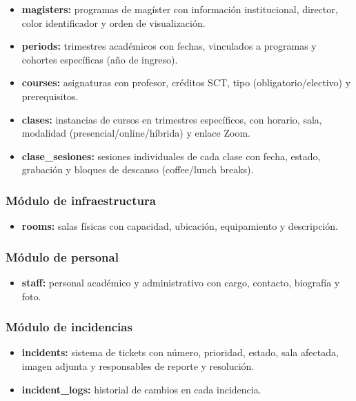 \begin{itemize}
    \item \textbf{magisters:} programas de magíster con información institucional, director, color identificador y orden de visualización.
    \item \textbf{periods:} trimestres académicos con fechas, vinculados a programas y cohortes específicas (año de ingreso).
    \item \textbf{courses:} asignaturas con profesor, créditos SCT, tipo (obligatorio/electivo) y prerequisitos.
    \item \textbf{clases:} instancias de cursos en trimestres específicos, con horario, sala, modalidad (presencial/online/híbrida) y enlace Zoom.
    \item \textbf{clase\_sesiones:} sesiones individuales de cada clase con fecha, estado, grabación y bloques de descanso (coffee/lunch breaks).
\end{itemize}

\subsubsection{Módulo de infraestructura}

\begin{itemize}
    \item \textbf{rooms:} salas físicas con capacidad, ubicación, equipamiento y descripción.
\end{itemize}

\subsubsection{Módulo de personal}

\begin{itemize}
    \item \textbf{staff:} personal académico y administrativo con cargo, contacto, biografía y foto.
\end{itemize}

\subsubsection{Módulo de incidencias}

\begin{itemize}
    \item \textbf{incidents:} sistema de tickets con número, prioridad, estado, sala afectada, imagen adjunta y responsables de reporte y resolución.
    \item \textbf{incident\_logs:} historial de cambios en cada incidencia.
\end{itemize}

